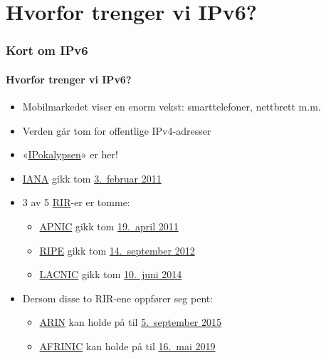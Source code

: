 \section{Hvorfor trenger vi IPv6?}
\begin{frame}%
  \frametitle{Kort om IPv6}
  \framesubtitle{Hvorfor trenger vi IPv6?}
  \pause
  \begin{itemize}[<+->]
  \item Mobilmarkedet viser en enorm vekst: smarttelefoner, nettbrett m.m.
  \item Verden går tom for offentlige IPv4-adresser
  \item
    «\href{http://www.potaroo.net/presentations/2012-05-22-terena.pdf}{IPokalypsen}»
    er her!
  \item \href{http://www.iana.org/}{IANA} gikk tom
    \href{http://www.icann.org/en/news/press/releases/release-03feb11-en.pdf}{3.~februar
      2011}
  \item 3 av 5
    \href{http://en.wikipedia.org/wiki/Regional_Internet_registry}{RIR}-er
    er tomme:
    \begin{itemize}[<+->]
    \item \href{http://www.apnic.net/}{APNIC} gikk tom
      \href{http://www.apnic.net/community/ipv4-exhaustion/graphical-information}{19.~april
        2011}
    \item \href{http://www.ripe.net/}{RIPE} gikk tom
      \href{http://www.ripe.net/internet-coordination/ipv4-exhaustion}{14.~september
        2012}
    \item \href{http://www.lacnic.net/en/web/lacnic/inicio}{LACNIC}
      gikk tom
      \href{http://www.lacnic.net/en/web/lacnic/agotamiento-ipv4}{10.~juni
        2014}
    \end{itemize}
  \item Dersom disse to RIR-ene oppfører seg pent:
    \begin{itemize}
    \item \href{https://www.arin.net/}{ARIN} kan holde på til
      \href{http://www.potaroo.net/tools/ipv4/}{5.\ september 2015}
    \item \href{http://www.afrinic.net/}{AFRINIC} kan holde på til
      \href{http://www.potaroo.net/tools/ipv4/}{16.\ mai 2019}
    \end{itemize}
  \end{itemize}
\end{frame}

